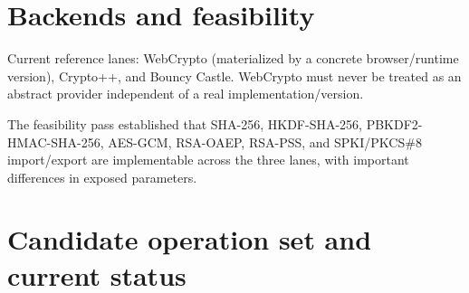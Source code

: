 \documentclass[11pt,a4paper]{article}
\begin{document}
\section{Backends and feasibility}
Current reference lanes: WebCrypto (materialized by a concrete browser/runtime version), Crypto++, and Bouncy Castle. WebCrypto must never be treated as an abstract provider independent of a real implementation/version.

The feasibility pass established that SHA-256, HKDF-SHA-256, PBKDF2-HMAC-SHA-256, AES-GCM, RSA-OAEP, RSA-PSS, and SPKI/PKCS\#8 import/export are implementable across the three lanes, with important differences in exposed parameters.

\section{Candidate operation set and current status}\label{sec:candidate-ops}
\end{document}
